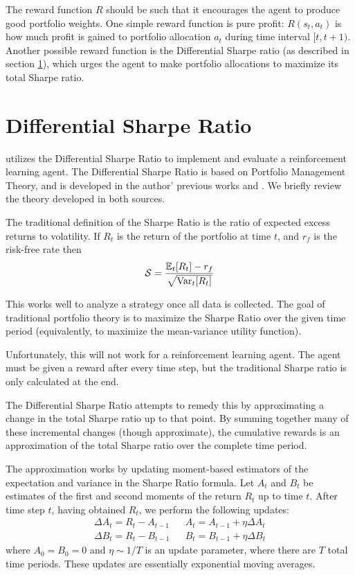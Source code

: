 The reward function $R$ should be such that it encourages the agent to produce good portfolio weights.
One simple reward function is pure profit: $R(s_t, a_t)$ is how much profit is gained to portfolio allocation $a_t$ during time interval $[t, t+1)$.
Another possible reward function is the Differential Sharpe ratio (as described in section \ref{diff_sharpe_ratio_section}), which urges the agent to make portfolio allocations to maximize its total Sharpe ratio. 



\section{Differential Sharpe Ratio}
\label{diff_sharpe_ratio_section}

\cite{drl_mvo} utilizes the Differential Sharpe Ratio to implement and evaluate a reinforcement learning agent.
The Differential Sharpe Ratio is based on Portfolio Management Theory, and is developed in the author' previous works \cite{diff_sharpe_ratio_paper} and \cite{diff_sharpe_ratio_book}.
We briefly review the theory developed in both sources.

The traditional definition of the Sharpe Ratio is the ratio of expected excess returns to volatility.
If $R_t$ is the return of the portfolio at time $t$, and $r_f$ is the risk-free rate then
\begin{align*}
  \mathcal{S} = \frac{\mathbb{E}_t[R_t] - r_f}{\sqrt{\operatorname{Var}_t[R_t]}}
\end{align*}

This works well to analyze a strategy once all data is collected.
The goal of traditional portfolio theory is to maximize the Sharpe Ratio over the given time period (equivalently,
to maximize the mean-variance utility function).

Unfortunately, this will not work for a reinforcement learning agent. The agent must be given a reward after every time step,
but the traditional Sharpe ratio is only calculated at the end.

The Differential Sharpe Ratio attempts to remedy this by approximating a change in the total Sharpe ratio up to that point.
By summing together many of these incremental changes (though approximate), the cumulative rewards is an approximation of the total
Sharpe ratio over the complete time period.

The approximation works by updating moment-based estimators of the expectation and variance in the Sharpe Ratio formula.
Let $A_t$ and $B_t$ be estimates of the first and second moments of the return $R_t$ up to time $t$.
After time step $t$, having obtained $R_t$, we perform the following updates:
\begin{align*}
  \Delta A_t = R_t - A_{t-1} && A_t = A_{t-1} + \eta \Delta A_t \\
  \Delta B_t = R_t - B_{t-1} && B_t = B_{t-1} + \eta \Delta B_t
\end{align*}
where $A_0 = B_0 = 0$ and $\eta \sim 1/T$ is an update parameter, where there are $T$ total time periods.
These updates are essentially exponential moving averages.

